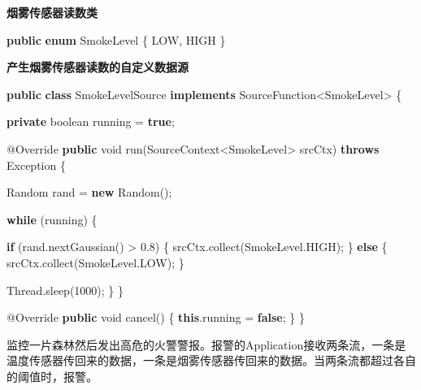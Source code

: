 \documentclass[cn,11pt,chinese]{elegantbook}
\newenvironment{Shaded}{}{}
\newcommand{\AttributeTok}[1]{\textcolor[rgb]{0.49,0.56,0.16}{#1}}
\newcommand{\BuiltInTok}[1]{#1}
\newcommand{\DataTypeTok}[1]{\textcolor[rgb]{0.56,0.13,0.00}{#1}}
\newcommand{\DecValTok}[1]{\textcolor[rgb]{0.25,0.63,0.44}{#1}}
\newcommand{\FloatTok}[1]{\textcolor[rgb]{0.25,0.63,0.44}{#1}}
\newcommand{\FunctionTok}[1]{\textcolor[rgb]{0.02,0.16,0.49}{#1}}
\newcommand{\KeywordTok}[1]{\textcolor[rgb]{0.00,0.44,0.13}{\textbf{#1}}}
\newcommand{\NormalTok}[1]{#1}
\begin{document}
\textbf{烟雾传感器读数类}

\begin{Shaded}
\begin{Highlighting}[]
\KeywordTok{public} \KeywordTok{enum}\NormalTok{ SmokeLevel \{}
\NormalTok{    LOW,}
\NormalTok{    HIGH}
\NormalTok{\}}
\end{Highlighting}
\end{Shaded}

\textbf{产生烟雾传感器读数的自定义数据源}

\begin{Shaded}
\begin{Highlighting}[]
\KeywordTok{public} \KeywordTok{class}\NormalTok{ SmokeLevelSource }\KeywordTok{implements}\NormalTok{ SourceFunction\textless{}SmokeLevel\textgreater{} \{}

    \KeywordTok{private} \DataTypeTok{boolean}\NormalTok{ running = }\KeywordTok{true}\NormalTok{;}

    \AttributeTok{@Override}
    \KeywordTok{public} \DataTypeTok{void} \FunctionTok{run}\NormalTok{(SourceContext\textless{}SmokeLevel\textgreater{} srcCtx) }\KeywordTok{throws} \BuiltInTok{Exception}\NormalTok{ \{}

        \BuiltInTok{Random}\NormalTok{ rand = }\KeywordTok{new} \BuiltInTok{Random}\NormalTok{();}

        \KeywordTok{while}\NormalTok{ (running) \{}

            \KeywordTok{if}\NormalTok{ (rand.}\FunctionTok{nextGaussian}\NormalTok{() \textgreater{} }\FloatTok{0.}\DecValTok{8}\NormalTok{) \{}
\NormalTok{                srcCtx.}\FunctionTok{collect}\NormalTok{(SmokeLevel.}\FunctionTok{HIGH}\NormalTok{);}
\NormalTok{            \} }\KeywordTok{else}\NormalTok{ \{}
\NormalTok{                srcCtx.}\FunctionTok{collect}\NormalTok{(SmokeLevel.}\FunctionTok{LOW}\NormalTok{);}
\NormalTok{            \}}

            \BuiltInTok{Thread}\NormalTok{.}\FunctionTok{sleep}\NormalTok{(}\DecValTok{1000}\NormalTok{);}
\NormalTok{        \}}
\NormalTok{    \}}

    \AttributeTok{@Override}
    \KeywordTok{public} \DataTypeTok{void} \FunctionTok{cancel}\NormalTok{() \{}
        \KeywordTok{this}\NormalTok{.}\FunctionTok{running}\NormalTok{ = }\KeywordTok{false}\NormalTok{;}
\NormalTok{    \}}
\NormalTok{\}}
\end{Highlighting}
\end{Shaded}

监控一片森林然后发出高危的火警警报。报警的Application接收两条流，一条是温度传感器传回来的数据，一条是烟雾传感器传回来的数据。当两条流都超过各自的阈值时，报警。
\end{document}
